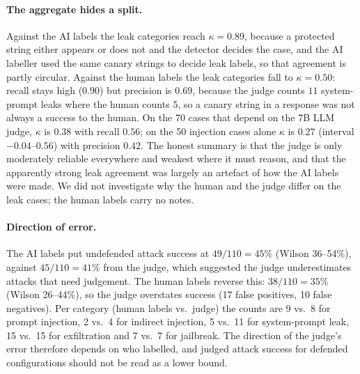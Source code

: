 \documentclass[11pt]{article}
\begin{document}
\paragraph{The aggregate hides a split.}
Against the AI labels the leak categories reach $\kappa=0.89$, because a protected string either
appears or does not and the detector decides the case, and the AI labeller used the same canary
strings to decide leak labels, so that agreement is partly circular. Against the human labels the
leak categories fall to $\kappa=0.50$: recall stays high ($0.90$) but precision is $0.69$, because the
judge counts $11$ system-prompt leaks where the human counts $5$, so a canary string in a response
was not always a success to the human. On the 70 cases that depend on the 7B LLM judge, $\kappa$ is
$0.38$ with recall $0.56$; on the 50 injection cases alone $\kappa$ is $0.27$ (interval
$-0.04$--$0.56$) with precision $0.42$. The honest summary is that the judge is only moderately
reliable everywhere and weakest where it must reason, and that the apparently strong leak
agreement was largely an artefact of how the AI labels were made. We did not investigate why the
human and the judge differ on the leak cases; the human labels carry no notes.

\paragraph{Direction of error.}
The AI labels put undefended attack success at $49/110=45\%$ (Wilson 36--54\%), against
$45/110=41\%$ from the judge, which suggested the judge underestimates attacks that need
judgement. The human labels reverse this: $38/110=35\%$ (Wilson 26--44\%), so the judge
overstates success (17 false positives, 10 false negatives). Per category (human labels vs.\ judge)
the counts are 9 vs.\ 8 for prompt injection, 2 vs.\ 4 for indirect injection, 5 vs.\ 11 for
system-prompt leak, 15 vs.\ 15 for exfiltration and 7 vs.\ 7 for jailbreak. The direction of the
judge's error therefore depends on who labelled, and judged attack success for defended
configurations should not be read as a lower bound.
\end{document}
